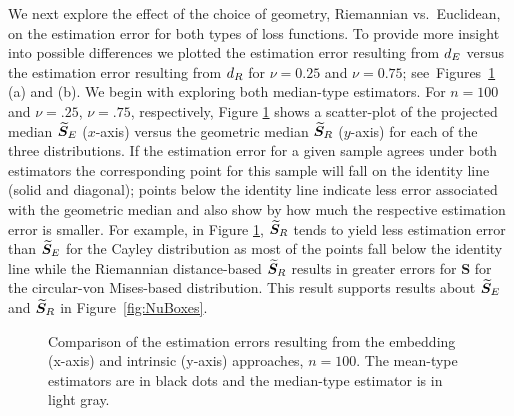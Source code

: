 We next explore the effect of the choice of geometry, Riemannian vs.~Euclidean, on the estimation error for both types of loss functions. To provide more insight into possible differences we plotted the estimation error resulting from ${d_E}$ versus the estimation error resulting from ${d_R}$ for $\nu=0.25$ and $\nu=0.75$; see~Figures~\ref{fig:comPL2} (a) and (b).   
We begin with exploring both median-type estimators. For $n=100$ and $\nu=.25$,  $\nu=.75$, respectively, Figure \ref{fig:comPL2} shows a scatter-plot of the projected median ${\widetilde{\bm S}_E}$ ($x$-axis) versus  the geometric median ${\widetilde{\bm S}_R}$ ($y$-axis) for each of the three distributions.  If the estimation error for a given sample agrees under both estimators the corresponding point for this sample will fall on the identity line (solid and diagonal); points below the identity line indicate less error associated with the geometric median and also show by how much the respective estimation error is smaller. For example, in Figure \ref{fig:comPL2},  ${\widetilde{\bm S}_R}$ tends to yield less estimation error than ${\widetilde{\bm S}_E}$  for the Cayley distribution as most of the points fall below the identity line while the Riemannian distance-based ${\widetilde{\bm S}_R}$ results in greater errors for ${\bm S}$ for the circular-von Mises-based distribution.  This result supports results about ${\widetilde{\bm S}_E}$ and ${\widetilde{\bm S}_R}$ in Figure~\ref{fig:NuBoxes}.

\begin{figure}[h!]
\centering
{}\newline
{}
\caption{Comparison of the estimation errors resulting from the embedding (x-axis) and intrinsic (y-axis) approaches, $n=100$.  The mean-type estimators are in black dots and the median-type estimator is in light gray.}
\label{fig:comPL2}
\end{figure}


